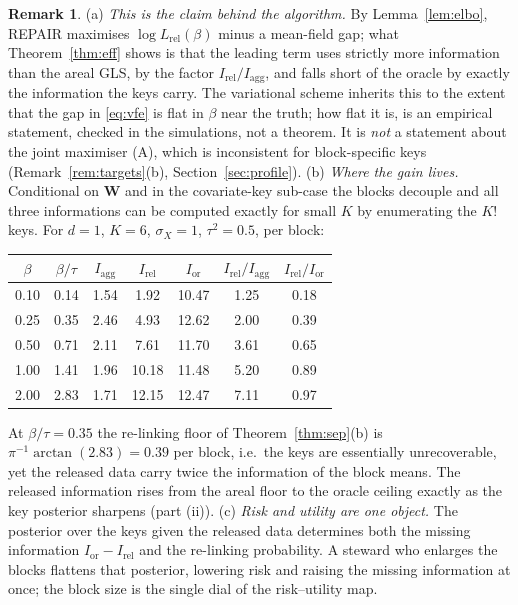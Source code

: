 \documentclass[11pt]{article}
\theoremstyle{definition}
\newtheorem{remark}{Remark}
\newcommand{\bW}{\mathbf{W}}
\newcommand{\rel}{\mathrm{rel}}
\newcommand{\agg}{\mathrm{agg}}
\newcommand{\orc}{\mathrm{or}}
\begin{document}
\begin{remark}\label{rem:eff}
(a) \emph{This is the claim behind the algorithm.} By Lemma~\ref{lem:elbo}, REPAIR maximises $\log L_\rel(\beta)$ minus a mean-field gap; what Theorem~\ref{thm:eff} shows is that the leading term uses strictly more information than the areal GLS, by the factor $I_\rel/I_\agg$, and falls short of the oracle by exactly the information the keys carry. The variational scheme inherits this to the extent that the gap in \eqref{eq:vfe} is flat in $\beta$ near the truth; how flat it is, is an empirical statement, checked in the simulations, not a theorem. It is \emph{not} a statement about the joint maximiser (A), which is inconsistent for block-specific keys (Remark~\ref{rem:targets}(b), Section~\ref{sec:profile}).
(b) \emph{Where the gain lives.} Conditional on $\bW$ and in the covariate-key sub-case the blocks decouple and all three informations can be computed exactly for small $K$ by enumerating the $K!$ keys. For $d=1$, $K=6$, $\sigma_X=1$, $\tau^2=0.5$, per block:
\begin{center}
\begin{tabular}{ccccccc}\toprule
$\beta$ & $\beta/\tau$ & $I_\agg$ & $I_\rel$ & $I_\orc$ & $I_\rel/I_\agg$ & $I_\rel/I_\orc$\\\midrule
0.10 & 0.14 & 1.54 & 1.92 & 10.47 & 1.25 & 0.18\\
0.25 & 0.35 & 2.46 & 4.93 & 12.62 & 2.00 & 0.39\\
0.50 & 0.71 & 2.11 & 7.61 & 11.70 & 3.61 & 0.65\\
1.00 & 1.41 & 1.96 & 10.18 & 11.48 & 5.20 & 0.89\\
2.00 & 2.83 & 1.71 & 12.15 & 12.47 & 7.11 & 0.97\\\bottomrule
\end{tabular}
\end{center}
At $\beta/\tau=0.35$ the re-linking floor of Theorem~\ref{thm:sep}(b) is $\pi^{-1}\arctan(2.83)=0.39$ per block, i.e.\ the keys are essentially unrecoverable, yet the released data carry twice the information of the block means. The released information rises from the areal floor to the oracle ceiling exactly as the key posterior sharpens (part (ii)).
(c) \emph{Risk and utility are one object.} The posterior over the keys given the released data determines both the missing information $I_\orc-I_\rel$ and the re-linking probability. A steward who enlarges the blocks flattens that posterior, lowering risk and raising the missing information at once; the block size is the single dial of the risk--utility map.

\end{remark}
\end{document}
